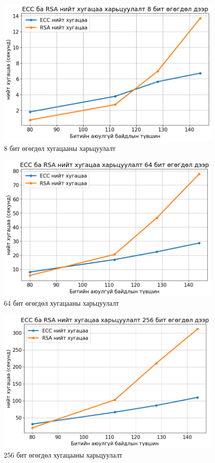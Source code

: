 \begin{figure}
	\centering
	\includegraphics[scale=0.65]{assets/graphs/7.png}
	\caption{8 бит өгөгдөл хугацааны харьцуулалт}
	\label{fig:architecture}
\end{figure}
\begin{figure}
	\centering
	\includegraphics[scale=0.65]{assets/graphs/8.png}
	\caption{64 бит өгөгдөл хугацааны харьцуулалт}
	\label{fig:architecture}
\end{figure}
\begin{figure}
	\centering
	\includegraphics[scale=0.65]{assets/graphs/9.png}
	\caption{256 бит өгөгдөл хугацааны харьцуулалт}
	\label{fig:architecture}
\end{figure}



